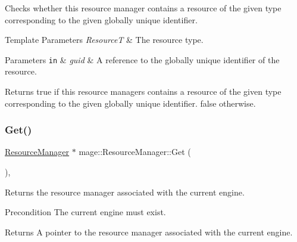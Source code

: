 Checks whether this resource manager contains a resource of the given type corresponding to the given globally unique identifier.


\begin{DoxyTemplParams}{Template Parameters}
{\em ResourceT} & The resource type. \\
\hline
\end{DoxyTemplParams}

\begin{DoxyParams}[1]{Parameters}
\mbox{\tt in}  & {\em guid} & A reference to the globally unique identifier of the resource. \\
\hline
\end{DoxyParams}
\begin{DoxyReturn}{Returns}
{\ttfamily true} if this resource managers contains a resource of the given type corresponding to the given globally unique identifier. {\ttfamily false} otherwise. 
\end{DoxyReturn}
\hypertarget{classmage_1_1_resource_manager_a1e6ca77d892578fc4df0e62dfbc807f6}{}\label{classmage_1_1_resource_manager_a1e6ca77d892578fc4df0e62dfbc807f6} 
\subsubsection{\texorpdfstring{Get()}{Get()}\hspace{0.1cm}{\footnotesize\ttfamily [1/2]}}
{\footnotesize\ttfamily \hyperlink{classmage_1_1_resource_manager}{Resource\+Manager} $\ast$ mage\+::\+Resource\+Manager\+::\+Get (\begin{DoxyParamCaption}{ }\end{DoxyParamCaption})\hspace{0.3cm}{\ttfamily [static]}, {\ttfamily [noexcept]}}

Returns the resource manager associated with the current engine.

\begin{DoxyPrecond}{Precondition}
The current engine must exist. 
\end{DoxyPrecond}
\begin{DoxyReturn}{Returns}
A pointer to the resource manager associated with the current engine. 
\end{DoxyReturn}
\hypertarget{classmage_1_1_resource_manager_a72fd77c4fb4286d9071ed5c63365ccd2}{}\label{classmage_1_1_resource_manager_a72fd77c4fb4286d9071ed5c63365ccd2} 
